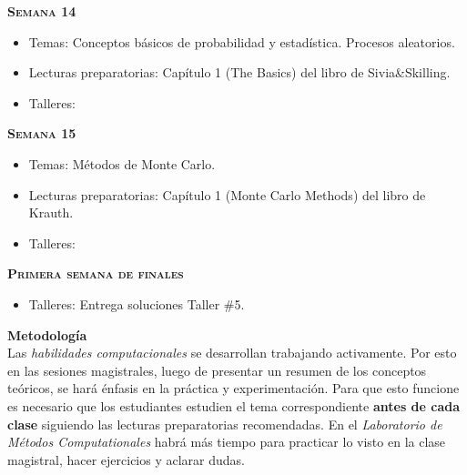 \documentclass[letterpaper,10pt,onecolumn]{article}
\begin{document}
\noindent\textbf{\textsc{Semana 14}}\\[-0.5cm]
\begin{itemize}
\item Temas: Conceptos b\'asicos de
  probabilidad y estad\'istica. Procesos aleatorios. \\[-0.6cm]  
\item Lecturas preparatorias: Cap\'itulo 1 (The Basics) del libro de
  Sivia\&Skilling. \\[-0.6cm]
\item Talleres: 
\\[-0.6cm]
\end{itemize}

\noindent\textbf{\textsc{Semana 15}}\\[-0.5cm]
\begin{itemize}
\item Temas: M\'etodos de Monte Carlo. \\[-0.6cm]
\item Lecturas preparatorias: Cap\'itulo 1 (Monte Carlo Methods) del
  libro de Krauth.\\[-0.6cm]
\item Talleres: \\[-0.6cm]
\end{itemize}

\noindent\textbf{\textsc{Primera semana de finales}}\\[-0.5cm]
\begin{itemize}
\item Talleres:
Entrega soluciones Taller \#5. 
\\[-0.6cm]
\end{itemize}


\vspace*{0.5cm} 
\noindent\textbf{\large {} \quad
  Metodolog\'ia}\\[-0.2cm] 


\noindent\normalsize 
Las \emph{habilidades computacionales} se desarrollan trabajando activamente. 
Por esto en las sesiones magistrales, luego de presentar un resumen de
los conceptos te\'oricos, se har\'a \'enfasis en la pr\'actica y
experimentaci\'on.   
Para que esto funcione es necesario que los estudiantes estudien el
tema correspondiente {\bf antes de cada clase} siguiendo las lecturas
preparatorias recomendadas. En el \emph{Laboratorio de M\'etodos
  Computationales} habr\'a m\'as tiempo para practicar lo visto en la
clase magistral, hacer ejercicios y aclarar dudas.   
\end{document}
